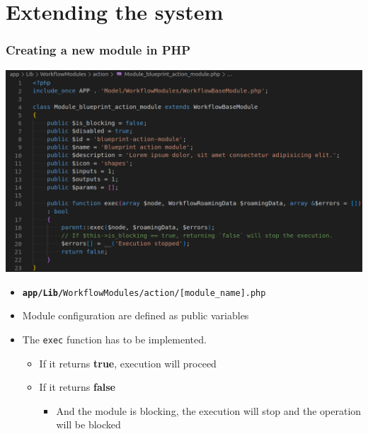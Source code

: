 \section{Extending the system}
\begin{frame}
    \frametitle{Creating a new module in PHP}
    \begin{center}
        \includegraphics[width=0.65\linewidth]{pictures/custom-1.png}
    \end{center}

    \begin{itemize}
        \item \texttt{\small \textbf{app/Lib/}WorkflowModules/action/[module\_name].php}
        \item Module configuration are defined as public variables
        \item The \texttt{exec} function has to be implemented.
        \begin{itemize}
            \item If it returns \textbf{true}, execution will proceed
            \item If it returns \textbf{false}
            \begin{itemize}
                \item And the module is blocking, the execution will stop and the operation will be blocked
            \end{itemize}
        \end{itemize}
    \end{itemize}
\end{frame}


